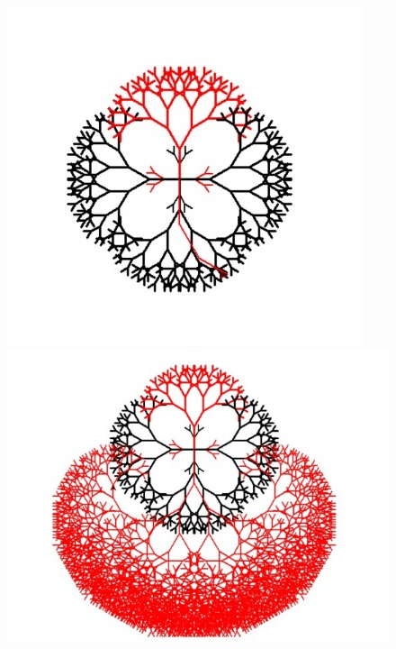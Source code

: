 \documentclass[addpoints]{exam}
\begin{document}
\begin{figure}[h]
\footnotesize  
  
    
        \begin{center}
              \includegraphics[height=.2\textheight, align=c]{tree1}
        \end{center}
          \begin{center}
              \includegraphics[height=.2\textheight, align=c]{tree2}
        \end{center}
           \begin{center}

\end{center}
\end{figure}
\end{document}

